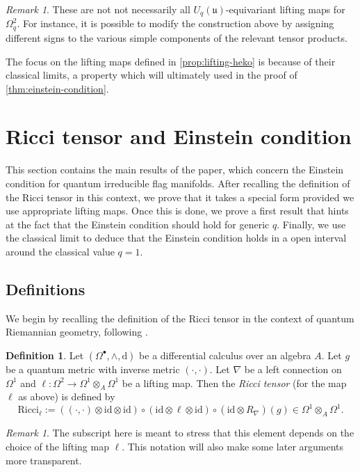 \documentclass[a4paper,12pt,reqno,english]{amsart}
\numberwithin{equation}{section}
\numberwithin{figure}{section}
\theoremstyle{plain}
\theoremstyle{plain}
\theoremstyle{plain}
\theoremstyle{plain}
\theoremstyle{plain}
\theoremstyle{definition}
\newtheorem{definition}[theorem]{Definition}
\theoremstyle{definition}
\theoremstyle{definition}
\theoremstyle{remark}
\newtheorem{remark}[theorem]{Remark}
\theoremstyle{definition}
\newcommand{\Uqu}{U_q(\mathfrak{u})}
\newcommand{\id}{\mathrm{id}}
\newcommand{\diff}{\mathrm{d}}
\newcommand{\Ricci}{\mathrm{Ricci}}
\newcommand{\diffcalc}{\Omega_q}
\newcommand{\wedgemap}{\mathord{\wedge}}
\begin{document}
\begin{remark}
These are not not necessarily all $\Uqu$-equivariant lifting maps for $\diffcalc^2$. For instance, it is possible to modify the construction above by assigning different signs to the various simple components of the relevant tensor products.

The focus on the lifting maps defined in \cref{prop:lifting-heko} is because of their classical limits, a property which will ultimately used in the proof of \cref{thm:einstein-condition}.
\end{remark}

\section{Ricci tensor and Einstein condition}
\label{sec:ricci-tensor}

This section contains the main results of the paper, which concern the Einstein condition for quantum irreducible flag manifolds.
After recalling the definition of the Ricci tensor in this context, we prove that it takes a special form provided we use appropriate lifting maps.
Once this is done, we prove a first result that hints at the fact that the Einstein condition should hold for generic $q$.
Finally, we use the classical limit to deduce that the Einstein condition holds in a open interval around the classical value $q = 1$.

\subsection{Definitions}

We begin by recalling the definition of the Ricci tensor in the context of quantum Riemannian geometry, following \cite[Section 8.1]{quantum-book}.

\begin{definition}
Let $(\Omega^\bullet, \wedgemap, \diff)$ be a differential calculus over an algebra $A$. Let $g$ be a quantum metric with inverse metric $(\cdot, \cdot)$. Let $\nabla$ be a left connection on $\Omega^1$ and $\ell: \Omega^2 \to \Omega^1 \otimes_A \Omega^1$ be a lifting map.
Then the \emph{Ricci tensor} (for the map $\ell$ as above) is defined by
\[
\Ricci_\ell := ((\cdot, \cdot) \otimes \id \otimes \id) \circ (\id \otimes \ell \otimes \id) \circ (\id \otimes R_\nabla)(g) \in \Omega^1 \otimes_A \Omega^1.
\]
\end{definition}

\begin{remark}
The subscript here is meant to stress that this element depends on the choice of the lifting map $\ell$.
This notation will also make some later arguments more transparent.
\end{remark}
\end{document}
